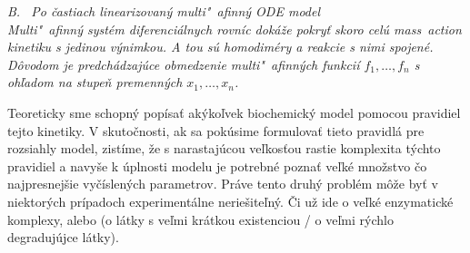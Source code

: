 \documentclass[11pt,final,oneside]{fithesis}
\begin{document}
\noindent
\it B. \ Po \v castiach linearizovan\'y multi"~afinn\'y ODE model\rm
\\

Multi"~afinn\'y syst\'em diferenci\'alnych rovn\'ic dok\'a\v ze pokry\v t skoro cel\'u mass~action kinetiku s jedinou v\'ynimkou. A tou s\'u 
homodim\'ery a reakcie s nimi spojen\'e. D\^ ovodom je predch\'adzaj\'uce obmedzenie multi"~afinn\'ych funkci\'i $f_1,\dots{},f_n$ s oh\v ladom 
na stupe\v n premenn\'ych $x_1,\dots{},x_n$.

Teoreticky sme schopn\'y  pop\'isa\v t ak\' yko\v lvek biochemick\'y model pomocou pravidiel tejto kinetiky. V skuto\v cnosti, ak sa pok\'usime formulova\v t 
tieto pravidl\'a pre rozsiahly model, zist\'ime, \v ze s narastaj\'ucou ve\v lkos\v tou rastie komplexita t\'ychto pravidiel a navy\v se k \'uplnosti modelu
je potrebn\'e pozna\v t ve\v lk\'e mno\v zstvo \v co najpresnej\v sie vy\v c\'islen\'ych parametrov. Pr\'ave tento druh\'y probl\'em m\^ o\v ze by\v t 
v niektor\'ych pr\'ipadoch experiment\'alne nerie\v site\v ln\'y. \v Ci u\v z ide o ve\v lk\'e enzymatick\'e komplexy, alebo (o l\'atky s ve\v lmi 
kr\'atkou existenciou / o ve\v lmi r\'ychlo degraduj\'ujce l\'atky).
\end{document}
